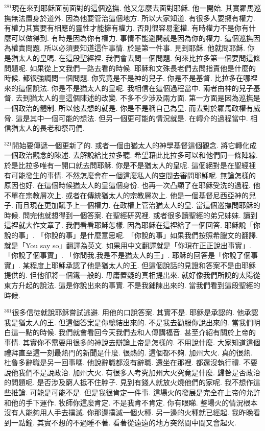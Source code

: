 \documentclass{book}
\begin{document}
$^{281}$現在來到耶穌面前面對的這個巡撫.
他又怎麼去面對耶穌.
他一開始.
其實羅馬巡撫無法置身於道外.
因為他要管治這個地方.
所以大家知道.
有很多人要擁有權力.
有權力其實要有相應的靈性才能擁有權力.
否則很容易濫權.
有時權力不是你有什麼可以做得到.
有時是因為你有權力.
事情不能避開就是因為你的權力.
這個巡撫因為權責問題.
所以必須要知道這件事情.
於是第一件事.
見到耶穌.
他就問耶穌.
你是猶太人的皇嗎.
在這段聖經裡.
我們會去問一個問題.
何來比拉多第一個要問這條問題呢.
如果從上文我們一路去看的時候.
耶穌和文殊長老們去問指責他是什麼的時候.
都很強調問一個問題.
你究竟是不是神的兒子.
你是不是基督.
比拉多在哪裡來的這個說法.
你是不是猶太人的皇呢.
我相信在這個過程當中.
兩者由神的兒子基督.
去到猶太人的皇這個陳述的改變.
不多不少涉及兩方面.
第一方面是因為巡撫是一個政治的體制.
所以他去想的就是.
你是不是稱自己為皇.
而去對於羅馬政權有威脅.
這是其中一個可能的想法.
但另一個更可能的情況就是.
在轉介的過程當中.
相信猶太人的長老和祭司們.

$^{321}$開始要傳遞一個更新了的.
或者一個由猶太人的神學基督這個觀念.
將它轉化成一個政治觀念的陳述.
去解說給比拉多聽.
希望藉此比拉多可以和他們同一條陣線.
於是比拉多唯有一開口就去問耶穌.
你是不是猶太人的皇呢.
這個絕對是在聖經裡有可能發生的事情.
不然怎麼會在一個這麼私人的空間去審問耶穌呢.
無論怎樣的原因也好.
在這個時候猶太人的皇這個身份.
也再一次凸顯了在耶穌受洗的過程.
他不單在宗教層次上.
或者在傳統猶太人的宗教層次上.
他是一個基督尼西亞神的兒子.
而且現在更加賦予上一個權力.
在政權上管治猶太人的皇.
當這個巡撫問耶穌的時候.
問完他就想得到一個答案.
在聖經研究裡.
或者很多讀聖經的弟兄姊妹.
讀到這裡就大作文章了.
我們看看耶穌怎樣.
因為耶穌在這裡給了一個回答.
耶穌說「你說的事」.
「你說的事」是什麼意思呢.
「你說的事」如果我們按照希臘文的翻譯.
就是「You say so」翻譯為英文.
如果用中文翻譯就是「你現在正正說出事實」.
「你說了個事實」.
「你問我,我是不是猶太人的王」.
耶穌的回答是「你說了個事實」.
某程度上耶穌承認了他是猶太人的王.
但這個說話的見證和答案不是由耶穌提供的.
但他卻將一個鐵一般的.
毋庸置疑的真相提出來.
就好像我們所說的太陽從東方升起的說法.
這是你說出來的事實.
不是我鋪陳出來的.
當我們看到這段聖經的時候.

$^{361}$很多信徒就說耶穌嘗試逃避.
用他的口說答案.
其實不是.
耶穌是承認的.
他承認我是猶太人的王.
但這個答案是你總結出來的.
不是我去勸服你說出來的.
當我們明白這一點的時候.
我們就會看回今天我們去和人傳講福音.
甚至介紹有關於上帝的事情.
其實你不需要用很多的神說去辯論上帝是怎樣的.
不用說什麼.
大家知道這個禮拜直至這一刻最熱門的新聞是什麼.
很熱的.
這個都不夠.
加州大火.
真的很熱.
杜魯多辭職是另一回事嗎.
他說辭職都沒有辭職.
還坐在那裡.
都還沒執行禮.
不要說他我們不是說政治.
加州大火.
有很多人考究加州大火究竟是什麼.
歸咎是否政治的問題呢.
是否涉及窮人抵不住脖子.
見到有錢人就放火燒他們的家呢.
我不想作這些推論.
可能是可能不是.
但是我很肯定一件事.
這場火的發展是完全在上帝的允許和他的手下運作.
牧師你這麼肯定.
不是我肯不肯定.
你有眼睇.
整場火的情況根本沒有人能夠用人手去撲滅.
你那邊撲滅一個火種.
另一邊的火種就已經起.
我昨晚看到一點鐘.
其實不想的不過睡不著.
看著從遠遠的地方突然間中間又會起火.
\end{document}
